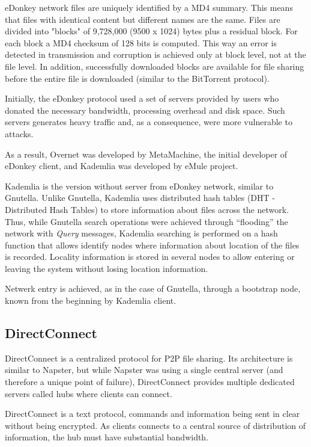 eDonkey network files are uniquely identified by a MD4 summary. This means
that files with identical content but different names are the same. Files are
divided into "blocks" of 9,728,000 (9500 x 1024) bytes plus a residual block.
For each block a MD4 checksum of 128 bits is computed. This way an error is
detected in transmission and corruption is achieved only at block level, not
at the file level. In addition, successfully downloaded blocks are available
for file sharing before the entire file is downloaded (similar to the
BitTorrent protocol).

Initially, the eDonkey protocol used a set of servers provided by users who
donated the necessary bandwidth, processing overhead and disk space. Such
servers generates heavy traffic and, as a consequence, were more vulnerable to
attacks.

As a result, Overnet was developed by MetaMachine, the initial developer of
eDonkey client, and Kademlia was developed by eMule project.

Kademlia is the version without server from eDonkey network, similar to
Gnutella.  Unlike Gnutella, Kademlia uses distributed hash tables (DHT -
Distributed Hash Tables) to store information about files across the network.
Thus, while Gnutella search operations were achieved through ``flooding'' the
network with \textit{Query} messages, Kademlia searching is performed on a
hash function that allows identify nodes where information about location of
the files is recorded. Locality information is stored in several nodes to
allow entering or leaving the system without losing location information.

Netwerk entry is achieved, as in the case of Gnutella, through a bootstrap
node, known from the beginning by Kademlia client.

\subsection{DirectConnect}

DirectConnect is a centralized protocol for P2P file sharing. Its architecture
is similar to Napster, but while Napster was using a single central server
(and therefore a unique point of failure), DirectConnect provides multiple
dedicated servers called hubs where clients can connect.

DirectConnect is a text protocol, commands and information being sent in clear
without being encrypted. As clients connects to a central source of
distribution of information, the hub must have substantial bandwidth.

